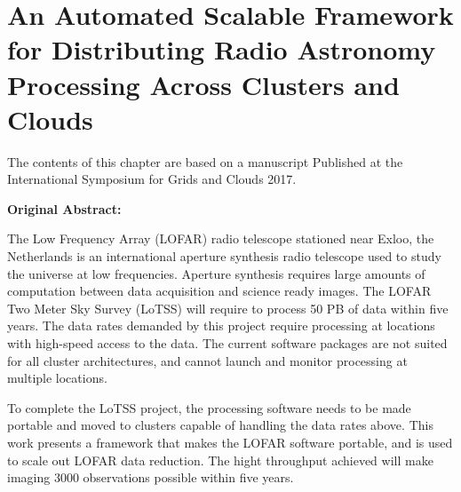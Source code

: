 

\chapter[LOFAR Scalability Framework]{An Automated Scalable Framework for Distributing Radio Astronomy Processing Across Clusters and Clouds}\label{ch:GRID_LRT}



%        


\begin{frshaded*}
    The contents of this chapter are based on a manuscript Published at the International Symposium for Grids and Clouds 2017. 
\end{frshaded*}
%


\setlength\FrameRule{1.5pt}
\begin{frshaded*}
    \textbf{Original Abstract:}

The Low Frequency Array (LOFAR) radio telescope stationed near Exloo, the Netherlands is an international aperture synthesis radio telescope used to study the universe at low frequencies. Aperture synthesis requires large amounts of computation between data acquisition and science ready images. The LOFAR Two Meter Sky Survey (LoTSS) will require to process 50 PB of data within five years. The data rates demanded by this project require processing at locations with high-speed access to the data. The current software packages are not suited for all cluster architectures, and cannot launch and monitor processing at multiple locations. 

To complete the LoTSS project, the processing software needs to be made portable and moved to clusters capable of handling the data rates above. This work presents a framework that makes the LOFAR software portable, and is used to scale out LOFAR data reduction. The hight throughput achieved will make imaging 3000 observations possible within five years.
\end{frshaded*}
%

